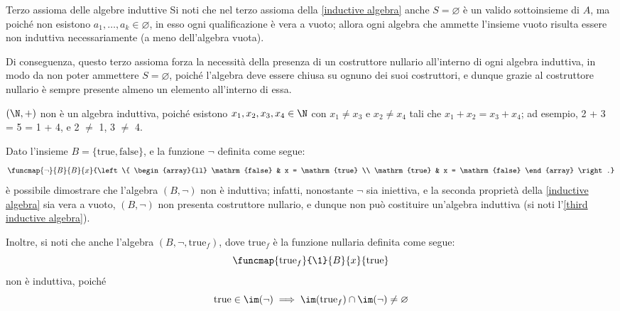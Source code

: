 \documentclass[a4paper, 12pt]{report}
\begin{document}
    \begin{framedobs}[label={third inductive algebra}]{Terzo assioma delle algebre induttive}
        Si noti che nel terzo assioma della \cref{inductive algebra} anche $S = \varnothing$ è un valido sottoinsieme di $A$, ma poiché non esistono $a_1, \ldots, a_k \in \varnothing$, in esso ogni qualificazione è vera a vuoto; allora ogni algebra che ammette l'insieme vuoto risulta essere non induttiva necessariamente (a meno dell'algebra vuota).
        
        Di conseguenza, questo terzo assioma forza la necessità della presenza di un costruttore nullario all'interno di ogni algebra induttiva, in modo da non poter ammettere $S = \varnothing$, poiché l'algebra deve essere chiusa su ognuno dei suoi costruttori, e dunque grazie al costruttore nullario è sempre presente almeno un elemento all'interno di essa.
    \end{framedobs}

    \begin{nonexample}
        $(\N, +)$ non è un algebra induttiva, poiché esistono $x_1, x_2, x_3, x_4 \in \N$ con $x_1 \neq x_3$ e $x_2 \neq x_4$ tali che $x_1 + x_2 = x_3 + x_4$; ad esempio, 2 + 3 = 5 = 1 + 4, e 2 $\neq$ 1, 3 $\neq$ 4.
    \end{nonexample}

    \begin{nonexample}
        Dato l'insieme $B = \{ \mathrm{true}, \mathrm{false}\}$, e la funzione $\lnot$ definita come segue: $$\funcmap{\lnot}{B}{B}{x}{\left \{ \begin{array}{ll} \mathrm{false} & x = \mathrm{true} \\ \mathrm{true} & x = \mathrm{false} \end{array} \right.}$$ è possibile dimostrare che l'algebra $(B, \lnot)$ non è induttiva; infatti, nonostante $\lnot$ sia iniettiva, e la seconda proprietà della \cref{inductive algebra} sia vera a vuoto, $(B, \lnot)$ non presenta costruttore nullario, e dunque non può costituire un'algebra induttiva (si noti l'\cref{third inductive algebra}).

        Inoltre, si noti che anche l'algebra $(B, \lnot, \mathrm{true}_f)$, dove $\mathrm{true}_f$ è la funzione nullaria definita come segue: $$\funcmap{\mathrm{true}_f}{\1}{B}{x}{\mathrm{true}}$$ non è induttiva, poiché $$\mathrm{true} \in \im(\lnot) \implies \im(\mathrm{true}_f) \cap \im(\lnot) \neq \varnothing$$
    \end{nonexample}
\end{document}

